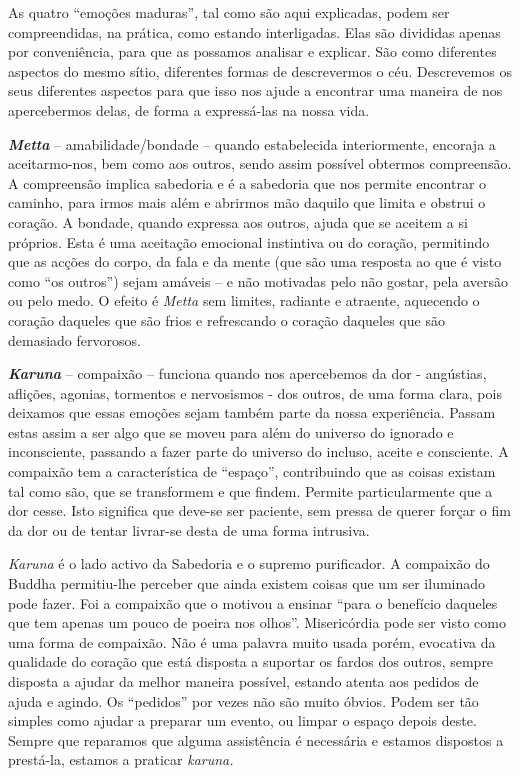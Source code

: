 As quatro ``emoções maduras'', tal como são aqui explicadas, podem ser
compreendidas, na prática, como estando interligadas. Elas são divididas
apenas por conveniência, para que as possamos analisar e explicar. São
como diferentes aspectos do mesmo sítio, diferentes formas de
descrevermos o céu. Descrevemos os seus diferentes aspectos para que
isso nos ajude a encontrar uma maneira de nos apercebermos delas, de
forma a expressá-las na nossa vida.

\emph{\textbf{Metta}} -- amabilidade/bondade -- quando estabelecida
interiormente, encoraja a aceitarmo-nos, bem como aos outros, sendo
assim possível obtermos compreensão. A compreensão implica sabedoria e é
a sabedoria que nos permite encontrar o caminho, para irmos mais além e
abrirmos mão daquilo que limita e obstrui o coração. A bondade, quando
expressa aos outros, ajuda que se aceitem a si próprios. Esta é uma
aceitação emocional instintiva ou do coração, permitindo que as acções
do corpo, da fala e da mente (que são uma resposta ao que é visto como
``os outros'') sejam amáveis -- e não motivadas pelo não gostar, pela
aversão ou pelo medo. O efeito é \emph{Metta} sem limites, radiante e
atraente, aquecendo o coração daqueles que são frios e refrescando o
coração daqueles que são demasiado fervorosos.

\emph{\textbf{Karuna}} -- compaixão -- funciona quando nos apercebemos da dor -
angústias, aflições, agonias, tormentos e nervosismos - dos outros, de
uma forma clara, pois deixamos que essas emoções sejam também parte da
nossa experiência. Passam estas assim a ser algo que se moveu para além
do universo do ignorado e inconsciente, passando a fazer parte do
universo do incluso, aceite e consciente. A compaixão tem a
característica de ``espaço'', contribuindo que as coisas existam tal
como são, que se transformem e que findem. Permite particularmente que a
dor cesse. Isto significa que deve-se ser paciente, sem pressa de querer
forçar o fim da dor ou de tentar livrar-se desta de uma forma intrusiva.

\emph{Karuna} é o lado activo da Sabedoria e o supremo purificador. A
compaixão do Buddha permitiu-lhe perceber que ainda existem coisas que
um ser iluminado pode fazer. Foi a compaixão que o motivou a ensinar
``para o benefício daqueles que tem apenas um pouco de poeira nos
olhos''. Misericórdia pode ser visto como uma forma de compaixão. Não é
uma palavra muito usada porém, evocativa da qualidade do coração que
está disposta a suportar os fardos dos outros, sempre disposta a ajudar
da melhor maneira possível, estando atenta aos pedidos de ajuda e
agindo. Os ``pedidos'' por vezes não são muito óbvios. Podem ser tão
simples como ajudar a preparar um evento, ou limpar o espaço depois
deste. Sempre que reparamos que alguma assistência é necessária e
estamos dispostos a prestá-la, estamos a praticar \emph{karuna.}

